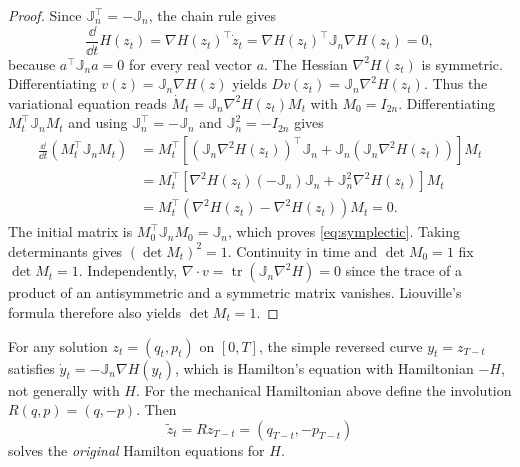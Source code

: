 \documentclass[12pt,a4paper,oneside]{book}
\begin{document}
\begin{proof}
Since $\mathbb J_n^\top=-\mathbb J_n$, the chain rule gives
\begin{equation*}
    \frac{\dd}{\dd t}H(z_t)
    =\nabla H(z_t)^\top\dot z_t
    =\nabla H(z_t)^\top \mathbb J_n\nabla H(z_t)=0,
\end{equation*}
because $a^\top\mathbb J_n a=0$ for every real vector $a$.
The Hessian $\nabla^2H(z_t)$ is symmetric. Differentiating
$v(z)=\mathbb J_n\nabla H(z)$ yields $Dv(z_t)=\mathbb J_n\nabla^2H(z_t)$. Thus the
variational equation reads $\dot M_t=\mathbb J_n\nabla^2H(z_t)M_t$ with $M_0=I_{2n}$.
Differentiating $M_t^\top\mathbb J_n M_t$ and using $\mathbb J_n^\top=-\mathbb J_n$ and
$\mathbb J_n^2=-I_{2n}$ gives
\begin{equation*}
    \begin{aligned}
        \frac{\dd}{\dd t}(M_t^\top\mathbb J_n M_t)
        &=M_t^\top\left[(\mathbb J_n\nabla^2H(z_t))^\top \mathbb J_n+\mathbb J_n(\mathbb J_n\nabla^2H(z_t))\right]M_t\\
        &=M_t^\top\left[\nabla^2H(z_t)(-\mathbb J_n)\mathbb J_n+\mathbb J_n^2\nabla^2H(z_t)\right]M_t\\
        &=M_t^\top(\nabla^2H(z_t)-\nabla^2H(z_t))M_t=0.
    \end{aligned}
\end{equation*}
The initial matrix is $M_0^\top\mathbb J_n M_0=\mathbb J_n$, which proves \eqref{eq:symplectic}. Taking determinants gives
$(\det M_t)^2=1$. Continuity in time and $\det M_0=1$ fix $\det M_t=1$. Independently, $\nabla\cdot v=\operatorname{tr}(\mathbb J_n\nabla^2H)=0$
since the trace of a product of an antisymmetric and a symmetric matrix vanishes. Liouville's formula therefore also yields
$\det M_t=1$.
\end{proof}

\begin{proposition}
\label{prop:ham-time-reversal}
\label{src:p10q3}

For any solution $z_t=(q_t,p_t)$ on $[0,T]$, the simple reversed curve $y_t=z_{T-t}$ satisfies $\dot y_t=-\mathbb J_n\nabla H(y_t)$,
which is Hamilton's equation with Hamiltonian $-H$, not generally with $H$. For the mechanical Hamiltonian above define
the involution $R(q,p)=(q,-p)$. Then
\begin{equation*}
    \widetilde z_t=Rz_{T-t}=(q_{T-t},-p_{T-t})
\end{equation*}
solves the \emph{original} Hamilton equations for $H$.
\end{proposition}
\end{document}

